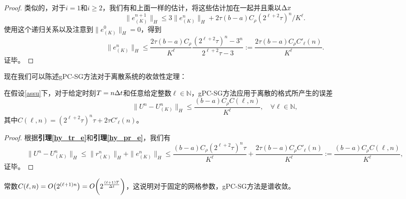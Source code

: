 \begin{proof}
类似的，对于$i = 1$和$i\geq 2$，我们有和上面一样的估计，将这些估计加在一起并且乘以$\Delta x$
  \begin{equation}
    \|e^{n+1}_{(K)}\|_H \leq  3\|e^n_{(K)}\|_H + 2\tau(b-a)C_\rho (2^{\ell+2}\tau)^n /K^\ell.
  \end{equation}
  使用这个递归关系以及注意到$\|e^0_{(K)}\|_H=0$，得到
  \begin{equation}
    \|e^n_{(K)}\|_H \leq \dfrac{2\tau(b-a)C_\rho}{K^\ell}\dfrac{(2^{\ell+2}\tau)^n - 3^n}{2^{\ell+2}\tau - 3}:=\frac{2\tau(b-a)C_\rho C'_\ell(n)}{K^\ell}.
  \end{equation}
  证毕。
\end{proof}

现在我们可以陈述gPC-SG方法对于离散系统的收敛性定理：
\begin{thm}\label{gpc_conv}
  在假设\ref{assu}下，对于给定时刻$T = n\Delta t$和任意给定整数$\ell\in\mathbb{N}$，gPC-SG方法应用于离散的格式所产生的误差
  \begin{equation}
    \|U^n - U^n_{(K)}\|_H \leq \frac{(b-a)C_\rho C(\ell,n)}{K^\ell}, \quad\forall\ell\in\mathbb{N},
  \end{equation}
  其中$C(\ell, n) = (2^{\ell+2}\tau)^n\tau + 2 \tau C'_\ell(n)$。
\end{thm}
\begin{proof}
  根据{\bf 引理\ref{hy_tr_e}}和{\bf 引理\ref{hy_pr_e}}，我们有
  \begin{equation*}
    \|U^n - U^n_{(K)}\|_H \le \|r^n_{(K)}\|_H +  \|e^n_{(K)}\|_H \leq \frac{(b-a)C_\rho (2^{\ell+2}\tau)^n\tau}{K^\ell} + \frac{2\tau(b-a)C_\rho C'_\ell(n)}{K^\ell} := \frac{(b-a)C_\rho C(\ell,n)}{K^\ell},
  \end{equation*}
  证毕。
\end{proof}
\begin{rem}
  常数$C(\ell, n) = O\big(2^{(\ell+1)n}\big) = O\bigg(2^{\frac{(\ell+1)T}{\Delta t}}\bigg)$，这说明对于固定的网格参数，gPC-SG方法是谱收敛。
\end{rem}


